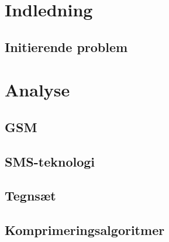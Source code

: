 \documentclass[12pt,a4paper]{report}
\begin{document}
\setcounter{page}{2}

\begin{titlepage}

\thispagestyle{empty}
\end{titlepage}

\newpage
\thispagestyle{empty}
\mbox{}



\newpage
\thispagestyle{empty}
\mbox{}
{\small\tableofcontents}
\thispagestyle{empty}
\renewcommand{\chaptername}{Kapitel}


\newpage
\thispagestyle{empty}
\mbox{}

\chapter{Indledning}
\setcounter{page}{3}
	
	\section{Initierende problem}
	

\chapter{Analyse}
 
    

    \section{GSM}
    

	\section{SMS-teknologi}
	
	
	\section{Tegnsæt}
	
	
	\section{Komprimeringsalgoritmer}
	
	
\end{document}
